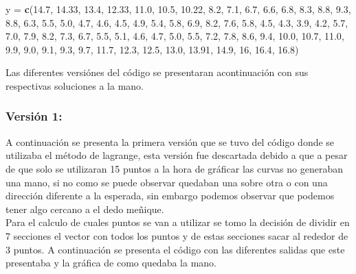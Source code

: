 \documentclass[]{article}
\newenvironment{Shaded}{\begin{snugshade}}{\end{snugshade}}
\newcommand{\KeywordTok}[1]{\textcolor[rgb]{0.13,0.29,0.53}{\textbf{#1}}}
\newcommand{\DecValTok}[1]{\textcolor[rgb]{0.00,0.00,0.81}{#1}}
\newcommand{\FloatTok}[1]{\textcolor[rgb]{0.00,0.00,0.81}{#1}}
\newcommand{\StringTok}[1]{\textcolor[rgb]{0.31,0.60,0.02}{#1}}
\newcommand{\NormalTok}[1]{#1}
\begin{document}
\begin{Shaded}
\begin{Highlighting}[]
\NormalTok{y =}\StringTok{ }\KeywordTok{c}\NormalTok{(}\FloatTok{14.7}\NormalTok{, }\FloatTok{14.33}\NormalTok{, }\FloatTok{13.4}\NormalTok{, }\FloatTok{12.33}\NormalTok{, }\FloatTok{11.0}\NormalTok{, }\FloatTok{10.5}\NormalTok{, }\FloatTok{10.22}\NormalTok{, }\FloatTok{8.2}\NormalTok{, }\FloatTok{7.1}\NormalTok{, }\FloatTok{6.7}\NormalTok{, }\FloatTok{6.6}\NormalTok{, }
  \FloatTok{6.8}\NormalTok{, }\FloatTok{8.3}\NormalTok{, }\FloatTok{8.8}\NormalTok{, }\FloatTok{9.3}\NormalTok{, }\FloatTok{8.8}\NormalTok{, }
  \FloatTok{6.3}\NormalTok{, }\FloatTok{5.5}\NormalTok{, }\FloatTok{5.0}\NormalTok{, }\FloatTok{4.7}\NormalTok{, }\FloatTok{4.6}\NormalTok{, }\FloatTok{4.5}\NormalTok{, }\FloatTok{4.9}\NormalTok{, }\FloatTok{5.4}\NormalTok{, }\FloatTok{5.8}\NormalTok{, }\FloatTok{6.9}\NormalTok{, }\FloatTok{8.2}\NormalTok{, }\FloatTok{7.6}\NormalTok{, }
  \FloatTok{5.8}\NormalTok{, }\FloatTok{4.5}\NormalTok{, }\FloatTok{4.3}\NormalTok{, }\FloatTok{3.9}\NormalTok{, }\FloatTok{4.2}\NormalTok{, }\FloatTok{5.7}\NormalTok{, }\FloatTok{7.0}\NormalTok{, }\FloatTok{7.9}\NormalTok{, }\FloatTok{8.2}\NormalTok{, }\FloatTok{7.3}\NormalTok{, }
  \FloatTok{6.7}\NormalTok{, }\FloatTok{5.5}\NormalTok{, }\FloatTok{5.1}\NormalTok{, }\FloatTok{4.6}\NormalTok{, }\FloatTok{4.7}\NormalTok{, }\FloatTok{5.0}\NormalTok{, }\FloatTok{5.5}\NormalTok{, }\FloatTok{7.2}\NormalTok{, }\FloatTok{7.8}\NormalTok{, }\FloatTok{8.6}\NormalTok{, }\FloatTok{9.4}\NormalTok{, }\FloatTok{10.0}\NormalTok{,  }\FloatTok{10.7}\NormalTok{, }\FloatTok{11.0}\NormalTok{, }
  \FloatTok{9.9}\NormalTok{, }\FloatTok{9.0}\NormalTok{, }\FloatTok{9.1}\NormalTok{, }\FloatTok{9.3}\NormalTok{, }\FloatTok{9.7}\NormalTok{, }\FloatTok{11.7}\NormalTok{, }
  \FloatTok{12.3}\NormalTok{, }\FloatTok{12.5}\NormalTok{, }\FloatTok{13.0}\NormalTok{, }\FloatTok{13.91}\NormalTok{, }\FloatTok{14.9}\NormalTok{, }\DecValTok{16}\NormalTok{, }\FloatTok{16.4}\NormalTok{, }\FloatTok{16.8}\NormalTok{)}
\end{Highlighting}
\end{Shaded}

Las diferentes versiónes del código se presentaran acontinuación con sus
respectivas soluciones a la mano.

\subsubsection{Versión 1:}\label{version-1}

A continuación se presenta la primera versión que se tuvo del código
donde se utilizaba el método de lagrange, esta versión fue descartada
debido a que a pesar de que solo se utilizaran 15 puntos a la hora de
gráficar las curvas no generaban una mano, si no como se puede observar
quedaban una sobre otra o con una dirección diferente a la esperada, sin
embargo podemos observar que podemos tener algo cercano a el dedo
meñique.\\
Para el calculo de cuales puntos se van a utilizar se tomo la decisión
de dividir en 7 secciones el vector con todos los puntos y de estas
secciones sacar al rededor de 3 puntos. A continuación se presenta el
código con las diferentes salidas que este presentaba y la gráfica de
como quedaba la mano.
\end{document}
